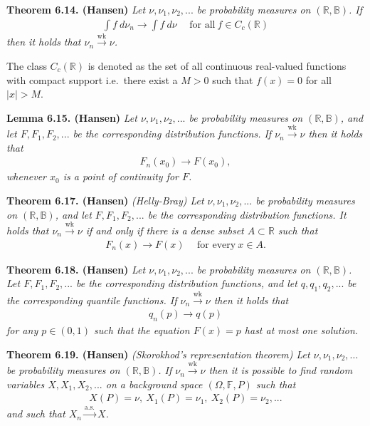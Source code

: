 \documentclass[a4paper,12pt,openany]{book}
\begin{document}
\textbf{Theorem 6.14. (Hansen)} \emph{Let \(\nu,\nu_1,\nu_2,...\) be probability measures on \((\mathbb{R},\mathbb{B})\). If}
\begin{align*}
    \int f\ d\nu_n\to \int f\ d\nu\hspace{15pt}\text{for all}\ f\in C_c(\mathbb{R})\tag{6.13}
\end{align*}
\emph{then it holds that \(\nu_n\stackrel{\text{wk}}{\to} \nu\).}

The class \(C_c(\mathbb{R})\) is denoted as the set of all continuous real-valued functions with compact support i.e.~there exist a \(M>0\) such that \(f(x)=0\) for all \(\vert x\vert>M\).

\textbf{Lemma 6.15. (Hansen)} \emph{Let \(\nu,\nu_1,\nu_2,...\) be probability measures on \((\mathbb{R},\mathbb{B})\), and let \(F,F_1,F_2,...\) be the corresponding distribution functions. If \(\nu_n\stackrel{\text{wk}}{\to}\nu\) then it holds that}
\begin{align*}
    F_n(x_0)\to F(x_0),
\end{align*}
\emph{whenever \(x_0\) is a point of continuity for \(F\).}

\textbf{Theorem 6.17. (Hansen)} \emph{(Helly-Bray) Let \(\nu,\nu_1,\nu_2,...\) be probability measures on \((\mathbb{R},\mathbb{B})\), and let \(F,F_1,F_2,...\) be the corresponding distribution functions. It holds that \(\nu_n\stackrel{\text{wk}}{\to}\nu\) if and only if there is a dense subset \(A\subset\mathbb{R}\) such that}
\begin{align*}
    F_n(x)\to F(x)\hspace{15pt}\text{for every}\ x\in A.\tag{6.16}
\end{align*}

\textbf{Theorem 6.18. (Hansen)} \emph{Let \(\nu,\nu_1,\nu_2,...\) be probability measures on \((\mathbb{R},\mathbb{B})\). Let \(F,F_1,F_2,...\) be the corresponding distribution functions, and let \(q,q_1,q_2,...\) be the corresponding quantile functions. If \(\nu_n\stackrel{\text{wk}}{\to}\nu\) then it holds that}
\begin{align*}
    q_n(p)\to q(p)
\end{align*}
\emph{for any \(p\in(0,1)\) such that the equation \(F(x)=p\) hast at most one solution.}

\textbf{Theorem 6.19. (Hansen)} \emph{(Skorokhod's representation theorem) Let \(\nu,\nu_1,\nu_2,...\) be probability measures on \((\mathbb{R},\mathbb{B})\). If \(\nu_n\stackrel{\text{wk}}{\to} \nu\) then it is possible to find random variables \(X,X_1,X_2,...\) on a background space \((\Omega,\mathbb{F},P)\) such that}
\begin{align*}
    X(P)=\nu,\ X_1(P)=\nu_1,\ X_2(P)=\nu_2, ...
\end{align*}
\emph{and such that \(X_n\stackrel{\text{a.s.}}{\to} X\).}
\end{document}
